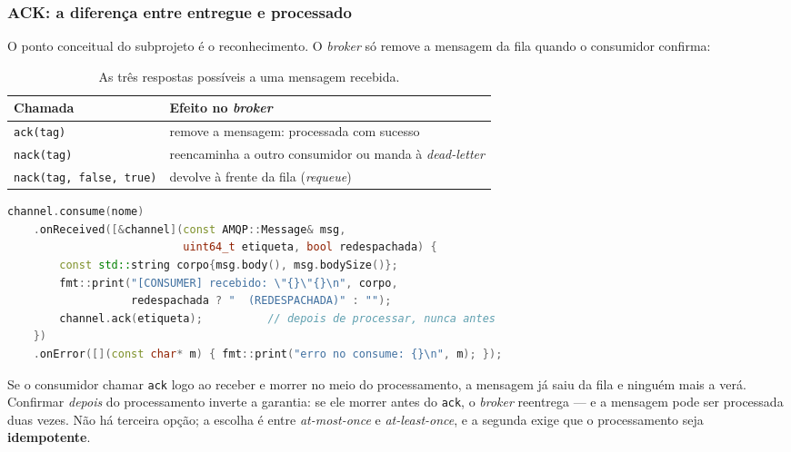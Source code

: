\subsubsection{ACK: a diferença entre entregue e processado}

O ponto conceitual do subprojeto é o reconhecimento. O \emph{broker} só remove a
mensagem da fila quando o consumidor confirma:

\begin{table}[htbp]
\centering
\caption{As três respostas possíveis a uma mensagem recebida.}
\label{tab:ack}
\footnotesize
\begin{tabular}{@{}ll@{}}
\toprule
\textbf{Chamada} & \textbf{Efeito no \emph{broker}} \\
\midrule
\texttt{ack(tag)}              & remove a mensagem: processada com sucesso \\
\texttt{nack(tag)}             & reencaminha a outro consumidor ou manda à \emph{dead-letter} \\
\texttt{nack(tag, false, true)}& devolve à frente da fila (\emph{requeue}) \\
\bottomrule
\end{tabular}
\end{table}

\begin{lstlisting}[style=bt, language=C++,
    caption={\texttt{src/rabbitmq/consumer.cpp}: o \texttt{ack} vem
             \textbf{depois} de processar, e o \emph{flag} de redespacho é
             informação útil.}]
channel.consume(nome)
    .onReceived([&channel](const AMQP::Message& msg,
                           uint64_t etiqueta, bool redespachada) {
        const std::string corpo{msg.body(), msg.bodySize()};
        fmt::print("[CONSUMER] recebido: \"{}\"{}\n", corpo,
                   redespachada ? "  (REDESPACHADA)" : "");
        channel.ack(etiqueta);          // depois de processar, nunca antes
    })
    .onError([](const char* m) { fmt::print("erro no consume: {}\n", m); });
\end{lstlisting}

\begin{armadilha}
Se o consumidor chamar \texttt{ack} logo ao receber e morrer no meio do
processamento, a mensagem já saiu da fila e ninguém mais a verá. Confirmar
\emph{depois} do processamento inverte a garantia: se ele morrer antes do
\texttt{ack}, o \emph{broker} reentrega --- e a mensagem pode ser processada
duas vezes. Não há terceira opção; a escolha é entre \emph{at-most-once} e
\emph{at-least-once}, e a segunda exige que o processamento seja
\textbf{idempotente}.
\end{armadilha}

